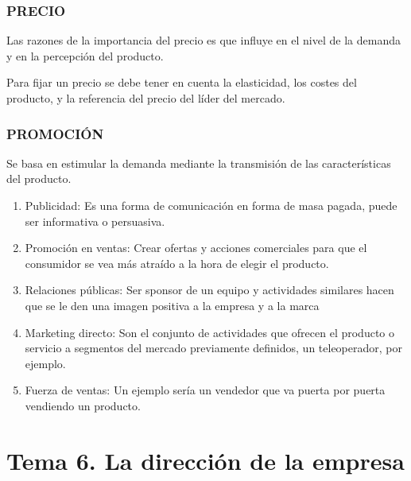 \documentclass[12pt, twoside, openright]{report} %
\begin{document}
\subsection{PRECIO}
Las razones de la importancia del precio es que influye en el nivel de la demanda y en la percepción
del producto.

Para fijar un precio se debe tener en cuenta la elasticidad, los costes del producto, y la referencia del
precio del líder del mercado.
\subsection{PROMOCIÓN}
Se basa en estimular la demanda mediante la transmisión de las características del producto.
\begin{enumerate}
	\item Publicidad: Es una forma de comunicación en forma de masa pagada, puede ser informativa o
	      persuasiva.
	\item Promoción en ventas: Crear ofertas y acciones comerciales para que el consumidor se vea más
	      atraído a la hora de elegir el producto.
	\item Relaciones públicas: Ser sponsor de un equipo y actividades similares hacen que se le den una
	      imagen positiva a la empresa y a la marca
	\item Marketing directo: Son el conjunto de actividades que ofrecen el producto o servicio a
	      segmentos del mercado previamente definidos, un teleoperador, por ejemplo.
	\item Fuerza de ventas: Un ejemplo sería un vendedor que va puerta por puerta vendiendo un
	      producto.
\end{enumerate}



\chapter{Tema 6. La dirección de la empresa}
\end{document}
